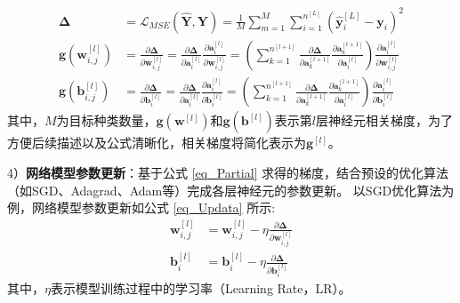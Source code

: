 \documentclass{xdupgthesis}
\begin{document}
\begin{equation}
    \begin{aligned}
        \mathbf{\Delta} & = 
        \mathcal{L}_{MSE}\left( \mathbf{\hat{Y}}, \mathbf{Y} \right) = \frac{1}{M} \sum_{m =
        1}^{M} {\sum_{i = 1}^{n^{[L]}}{\left(\mathbf{\hat{y}}_{i}^{[L]} - \mathbf{y}_{i} \right) ^{2}} }\\
        \mathbf{g}\left( \mathbf{w}_{i, j}^{[l]} \right) & =
        \frac{\partial \mathbf{\Delta}}{\partial \mathbf{w}_{i, j}^{[l]}} = 
        \frac{\partial \mathbf{\Delta}}{\partial \mathbf{a}_{i}^{[l]}} 
        \frac{\partial \mathbf{a}_{i}^{[l]}}{\partial \mathbf{w}_{i, j}^{[l]}} =
        \left(
            \sum_{k = 1}^{n^{[l+1]}}{
                \frac{\partial \mathbf{\Delta}}{\partial \mathbf{a}_{k}^{[l+1]}}
                \frac{\partial \mathbf{a}_{k}^{[l+1]}}{\partial \mathbf{a}_{i}^{[l]}}
            } 
        \right)
        \frac{\partial \mathbf{a}_{i}^{[l]}}{\partial \mathbf{w}_{i, j}^{[l]}} \\
        \mathbf{g}\left( \mathbf{b}_{i, j}^{[l]} \right) & = 
        \frac{\partial \mathbf{\Delta}}{\partial \mathbf{b}_{i}^{[l]}} = 
        \frac{\partial \mathbf{\Delta}}{\partial \mathbf{a}_{i}^{[l]}} 
        \frac{\partial \mathbf{a}_{i}^{[l]}}{\partial \mathbf{b}_{i}^{[l]}} =
        \left(
            \sum_{k = 1}^{n^{[l+1]}}{
                \frac{\partial \mathbf{\Delta}}{\partial \mathbf{a}_{k}^{[l+1]}}
                \frac{\partial \mathbf{a}_{k}^{[l+1]}}{\partial \mathbf{a}_{i}^{[l]}}
            } 
        \right)
        \frac{\partial \mathbf{a}_{i}^{[l]}}{\partial \mathbf{b}_{i}^{[l]}}
    \label{eq_Partial}
    \end{aligned}
\end{equation}
其中，$M$为目标种类数量，$\mathbf{g}\left( \mathbf{w}^{[l]} \right)$和$\mathbf{g}\left( \mathbf{b}^{[l]} \right)$表示第$l$层神经元相关梯度，为了方便后续描述以及公式清晰化，相关梯度将简化表示为$\mathbf{g}^{[l]}$。

4）\textbf{网络模型参数更新}：基于公式 \eqref{eq_Partial} 求得的梯度，结合预设的优化算法（如SGD、Adagrad、Adam等）完成各层神经元的参数更新。
以SGD优化算法为例，网络模型参数更新如公式 \eqref{eq_Updata} 所示:
\begin{equation}
    \begin{aligned}
        \mathbf{w}_{i, j}^{[l]} &=
        \mathbf{w}_{i, j}^{[l]} - \eta \frac{\partial \mathbf{\Delta}}{\partial \mathbf{w}_{i, j}^{[l]}}\\
        \mathbf{b}_{i}^{[l]} &=
        \mathbf{b}_{i}^{[l]} - \eta \frac{\partial \mathbf{\Delta}}{\partial \mathbf{b}_{i}^{[l]}}
        \label{eq_Updata}
    \end{aligned}
\end{equation}
其中，$\eta$表示模型训练过程中的学习率（Learning Rate，LR）。
\end{document}
